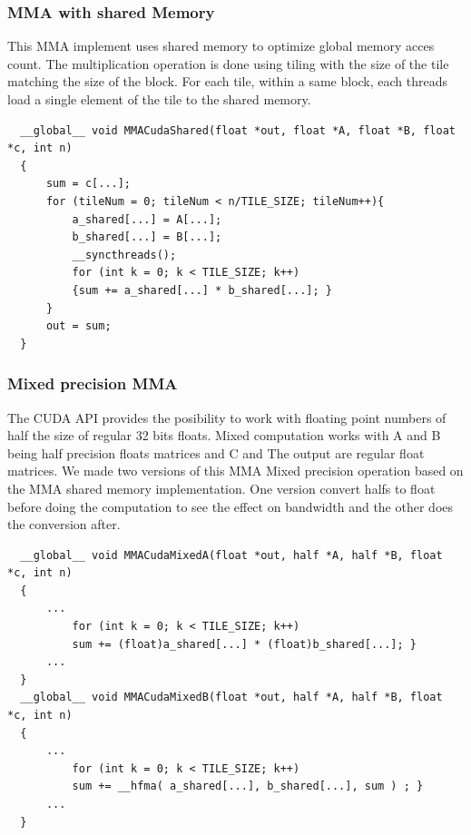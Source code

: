 \documentclass[conference]{IEEEtran}
\begin{document}
  \subsubsection[short]{MMA with shared Memory}
  This MMA implement uses shared memory to optimize global memory acces count. The multiplication operation 
  is done using tiling with the size of the tile matching the size of the block. For each tile, within
  a same block, each threads load a single element of the tile to the shared memory. 
  \begin{lstlisting}
  __global__ void MMACudaShared(float *out, float *A, float *B, float *c, int n)
  {   
      sum = c[...];
      for (tileNum = 0; tileNum < n/TILE_SIZE; tileNum++){
          a_shared[...] = A[...];
          b_shared[...] = B[...];
          __syncthreads();
          for (int k = 0; k < TILE_SIZE; k++)
          {sum += a_shared[...] * b_shared[...]; }
      }
      out = sum;
  }   
  \end{lstlisting}

  \subsubsection[short]{Mixed precision MMA}
  The CUDA API provides the posibility to work with floating point numbers of half the size of regular 32 bits floats.
  Mixed computation works with A and B being half precision floats matrices and C and The output are regular float matrices.
  We made two versions of this MMA Mixed precision operation based on the MMA shared memory implementation. One version
  convert halfs to float before doing the computation to see the effect on bandwidth and the other does the conversion after. 
  \begin{lstlisting}
  __global__ void MMACudaMixedA(float *out, half *A, half *B, float *c, int n)
  {   
      ...
          for (int k = 0; k < TILE_SIZE; k++)
          sum += (float)a_shared[...] * (float)b_shared[...]; }
      ...
  }
  __global__ void MMACudaMixedB(float *out, half *A, half *B, float *c, int n)
  {   
      ...
          for (int k = 0; k < TILE_SIZE; k++)
          sum += __hfma( a_shared[...], b_shared[...], sum ) ; }
      ...
  }
  \end{lstlisting}
\end{document}
